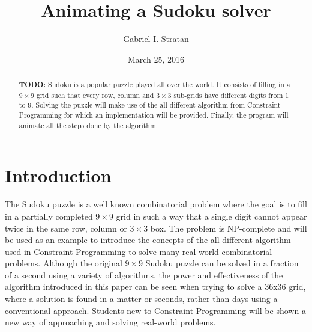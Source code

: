 \documentclass{l4proj}
\begin{document}
\title{Animating a Sudoku solver}
\author{Gabriel I. Stratan}
\date{March 25, 2016}
\maketitle

\begin{abstract}
\textbf{TODO:} Sudoku is a popular puzzle played all over the world. It consists of filling in a $9 \times 9$ grid such that every row, column and $3\times 3$ sub-grids have different digits from 1 to 9. Solving the puzzle will make use of the all-different algorithm from Constraint Programming for which an implementation will be provided. Finally, the program will animate all the steps done by the algorithm.
\end{abstract}

\educationalconsent
%
%
\tableofcontents
\chapter{Introduction}
\label{chap1intro}

\noindent The Sudoku puzzle is a well known combinatorial problem where the goal is to fill in a partially completed $9 \times 9$ grid in such a way that a single digit cannot appear twice in the same row, column or $3\times 3$ box. The problem is NP-complete and will be used as an example to introduce the concepts of the all-different algorithm used in Constraint Programming to solve many real-world combinatorial problems. Although the original $9 \times 9$ Sudoku puzzle can be solved in a fraction of a second using a variety of algorithms, the power and effectiveness of the algorithm introduced in this paper can be seen when trying to solve a 36x36 grid, where a solution is found in a matter or seconds, rather than days using a conventional approach. Students new to Constraint Programming will be shown a new way of approaching and solving real-world problems.
\end{document}

